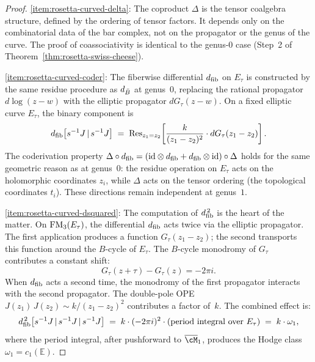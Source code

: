 \begin{proof}
\ref{item:rosetta-curved-delta}:
The coproduct $\Delta$ is the tensor coalgebra structure,
defined by the ordering of tensor factors.  It depends only on the
combinatorial data of the bar complex, not on the propagator
or the genus of the curve.  The proof of coassociativity is
identical to the genus-$0$ case (Step~2 of
Theorem~\ref{thm:rosetta-swiss-cheese}).

\medskip
\ref{item:rosetta-curved-coder}:
The fiberwise differential $d_{\mathrm{fib}}$ on $E_\tau$ is constructed
by the same residue procedure as $d_{\bar{B}}$ at genus~$0$,
replacing the rational propagator $d\log(z - w)$ with the
elliptic propagator $dG_\tau(z - w)$.  On a fixed elliptic
curve $E_\tau$, the binary component is
\begin{equation}\label{eq:rosetta-dfib-binary}
d_{\mathrm{fib}}\bigl[s^{-1}J \,|\, s^{-1}J\bigr]
\;=\;
\operatorname{Res}_{z_1 = z_2}\!\left[
  \frac{k}{(z_1 - z_2)^2}
  \cdot dG_\tau(z_1 - z_2)
\right].
\end{equation}
The coderivation property $\Delta \circ d_{\mathrm{fib}}
= (\mathrm{id} \otimes d_{\mathrm{fib}} + d_{\mathrm{fib}} \otimes \mathrm{id}) \circ \Delta$
holds for the same geometric reason as at genus~$0$: the
residue operation on $E_\tau$ acts on the holomorphic
coordinates $z_i$, while $\Delta$ acts on the tensor ordering
(the topological coordinates $t_i$).  These directions remain
independent at genus~$1$.

\medskip
\ref{item:rosetta-curved-dsquared}:
The computation of $d_{\mathrm{fib}}^{\,2}$ is the heart of the matter.
On $\mathrm{FM}_3(E_\tau)$, the differential $d_{\mathrm{fib}}$ acts twice via
the elliptic propagator.  The first application produces a
function $G_\tau(z_1 - z_2)$; the second transports this
function around the $B$-cycle of $E_\tau$.  The
$B$-cycle monodromy of $G_\tau$ contributes a constant shift:
\begin{equation}\label{eq:rosetta-monodromy}
G_\tau(z + \tau) - G_\tau(z) = -2\pi i.
\end{equation}
When $d_{\mathrm{fib}}$ acts a second time, the monodromy of the first
propagator interacts with the second propagator.  The
double-pole OPE $J(z_1)\, J(z_2) \sim k/(z_1 - z_2)^2$
contributes a factor of~$k$.  The combined effect is:
\begin{equation}\label{eq:rosetta-dsquared-computation}
d_{\mathrm{fib}}^{\,2}\bigl[s^{-1}J \,|\, s^{-1}J \,|\, s^{-1}J\bigr]
\;=\;
k \cdot (-2\pi i)^2 \cdot
\left(
  \text{period integral over } E_\tau
\right)
\;=\;
k \cdot \omega_1,
\end{equation}
where the period integral, after pushforward to
$\overline{\cM}_1$, produces the Hodge class
$\omega_1 = c_1(\mathbb{E})$.


\end{proof}
